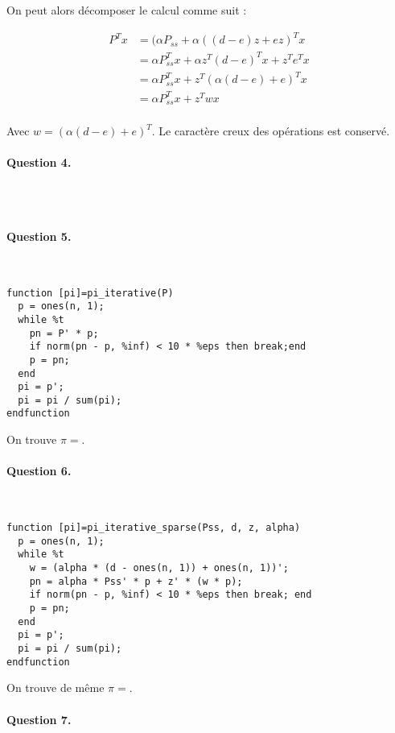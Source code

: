\documentclass[12pt,a4paper]{article}
\begin{document}
On peut alors décomposer le calcul comme suit :

\begin{align*}
P^T x
&= (\alpha P_{ss} + \alpha ((d - e) z + ez)^T x \\
&= \alpha P_{ss}^T x + \alpha z^T (d - e)^T x + z^T e^T x \\
&= \alpha P_{ss}^T x + z^T (\alpha (d - e) + e)^T x \\
&= \alpha P_{ss}^T x + z^T w x \\
\end{align*}

Avec $w = (\alpha (d - e) + e)^T$. Le caractère creux des opérations est conservé.

\paragraph*{Question 4.}
~
\begin{lstlisting}

\end{lstlisting}

\paragraph*{Question 5.}
~
\begin{lstlisting}
function [pi]=pi_iterative(P)
  p = ones(n, 1);
  while %t
    pn = P' * p;
    if norm(pn - p, %inf) < 10 * %eps then break;end
    p = pn;
  end
  pi = p';
  pi = pi / sum(pi);
endfunction
\end{lstlisting}

On trouve $\pi = $.

\paragraph*{Question 6.}
~
\begin{lstlisting}
function [pi]=pi_iterative_sparse(Pss, d, z, alpha)
  p = ones(n, 1);
  while %t
    w = (alpha * (d - ones(n, 1)) + ones(n, 1))';
    pn = alpha * Pss' * p + z' * (w * p);
    if norm(pn - p, %inf) < 10 * %eps then break; end
    p = pn;
  end
  pi = p';
  pi = pi / sum(pi);
endfunction
\end{lstlisting}

On trouve de même $\pi = $.

\paragraph*{Question 7.}
\end{document}
